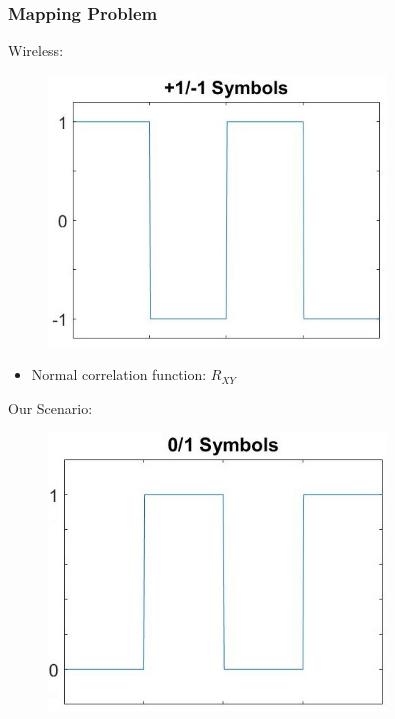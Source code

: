 \documentclass{beamer}
\begin{document}
	\begin{frame}\frametitle{Mapping Problem}

		\noindent
		\begin{minipage}{.5\linewidth}
			Wireless:
			\begin{figure}
				\centering
				\includegraphics[width=0.8\textwidth]{mapping_radio_symbols.jpg}
			\end{figure}

			\begin{itemize}
				\item Normal correlation function: $R_{XY}$
			\end{itemize}
			
		\end{minipage}%
		\begin{minipage}{.5\linewidth}

			Our Scenario:
			\begin{figure}
				\centering
				\includegraphics[width=0.8\textwidth]{mapping_binary_symbols.jpg}
			\end{figure}


\end{minipage}
\end{frame}
\end{document}
